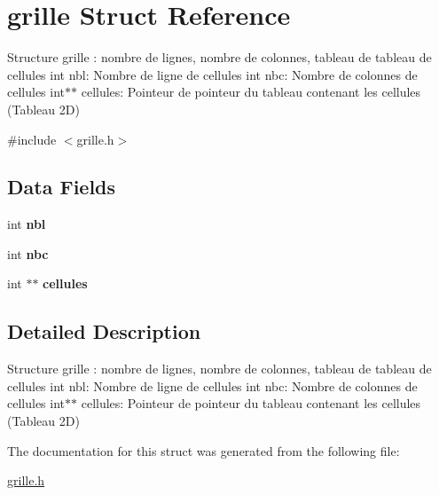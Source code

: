 \hypertarget{structgrille}{}\section{grille Struct Reference}
\label{structgrille}


Structure grille \+: nombre de lignes, nombre de colonnes, tableau de tableau de cellules int nbl\+: Nombre de ligne de cellules int nbc\+: Nombre de colonnes de cellules int$\ast$$\ast$ cellules\+: Pointeur de pointeur du tableau contenant les cellules (Tableau 2D)  




{\ttfamily \#include $<$grille.\+h$>$}

\subsection*{Data Fields}
\begin{DoxyCompactItemize}
\item 
int {\bfseries nbl}\hypertarget{structgrille_acf98b2c5c1a51e021aad6633fd2c41c6}{}\label{structgrille_acf98b2c5c1a51e021aad6633fd2c41c6}

\item 
int {\bfseries nbc}\hypertarget{structgrille_a965672cdeaba5c5352e804c1ac4bdb91}{}\label{structgrille_a965672cdeaba5c5352e804c1ac4bdb91}

\item 
int $\ast$$\ast$ {\bfseries cellules}\hypertarget{structgrille_a008dfdfef8fc75a738819f5329ee57a7}{}\label{structgrille_a008dfdfef8fc75a738819f5329ee57a7}

\end{DoxyCompactItemize}


\subsection{Detailed Description}
Structure grille \+: nombre de lignes, nombre de colonnes, tableau de tableau de cellules int nbl\+: Nombre de ligne de cellules int nbc\+: Nombre de colonnes de cellules int$\ast$$\ast$ cellules\+: Pointeur de pointeur du tableau contenant les cellules (Tableau 2D) 

The documentation for this struct was generated from the following file\+:\begin{DoxyCompactItemize}
\item 
\hyperlink{grille_8h}{grille.\+h}\end{DoxyCompactItemize}
